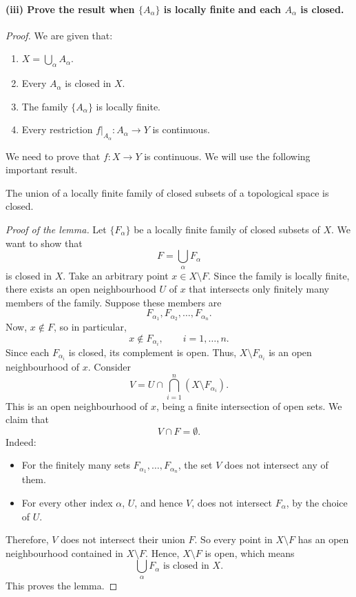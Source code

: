 \paragraph{(iii) Prove the result when $\{A_\alpha\}$ is locally finite and each $A_\alpha$ is closed.}
\begin{proof}
We are given that:
\begin{enumerate}
  \item $X=\bigcup_\alpha A_\alpha$.
  \item Every $A_\alpha$ is closed in $X$.
  \item The family $\{A_\alpha\}$ is locally finite.
  \item Every restriction $f|_{A_\alpha}\colon A_\alpha\to Y$ is continuous.
\end{enumerate}
We need to prove that $f\colon X\to Y$ is continuous. We will use the following important
result.

\begin{lemma}
The union of a locally finite family of closed subsets of a topological space is closed.
\end{lemma}

\emph{Proof of the lemma.}
Let $\{F_\alpha\}$ be a locally finite family of closed subsets of $X$. We want to show that
\[ F=\bigcup_\alpha F_\alpha \]
is closed in $X$. Take an arbitrary point $x\in X\setminus F$. Since the family is locally
finite, there exists an open neighbourhood $U$ of $x$ that intersects only finitely many members
of the family. Suppose these members are
\[ F_{\alpha_1},F_{\alpha_2},\dots,F_{\alpha_n}. \]
Now, $x\notin F$, so in particular,
\[ x\notin F_{\alpha_i},\qquad i=1,\dots,n. \]
Since each $F_{\alpha_i}$ is closed, its complement is open. Thus, $X\setminus F_{\alpha_i}$ is
an open neighbourhood of $x$. Consider
\[ V=U\cap\bigcap_{i=1}^n(X\setminus F_{\alpha_i}). \]
This is an open neighbourhood of $x$, being a finite intersection of open sets. We claim that
\[ V\cap F=\emptyset. \]
Indeed:
\begin{itemize}
  \item For the finitely many sets $F_{\alpha_1},\dots,F_{\alpha_n}$, the set $V$ does not
        intersect any of them.
  \item For every other index $\alpha$, $U$, and hence $V$, does not intersect $F_\alpha$, by
        the choice of $U$.
\end{itemize}
Therefore, $V$ does not intersect their union $F$. So every point in $X\setminus F$ has an open
neighbourhood contained in $X\setminus F$. Hence, $X\setminus F$ is open, which means
\[ \bigcup_\alpha F_\alpha\text{ is closed in }X. \]
This proves the lemma.


\end{proof}
